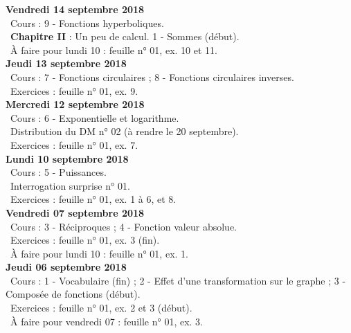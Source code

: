 \documentclass[12pt,a4paper]{article}
\begin{document}
\noindent\textbf{Vendredi 14 septembre 2018}\\
\bu\ Cours : 9 - Fonctions hyperboliques.\\
\bu\ \textbf{Chapitre II} \rm : Un peu de calcul. 1 - Sommes (début).\\
\bu\ À faire pour lundi 10 : feuille n° 01, ex. 10 et 11.\vspace{.4cm}\\

\noindent\textbf{\bf Jeudi 13 septembre 2018}\\
\bu\ Cours : 7 - Fonctions circulaires ; 8 - Fonctions circulaires inverses.\\
\bu\ Exercices : feuille n° 01, ex. 9.\vspace{.4cm}\\
    
\noindent\textbf{\bf Mercredi 12 septembre 2018}\\
\bu\ Cours : 6 - Exponentielle et logarithme.\\
\bu\ Distribution du DM n° 02 (à rendre le 20 septembre).\\
\bu\ Exercices : feuille n° 01, ex. 7.\vspace{.4cm}\\

\noindent\textbf{\bf Lundi 10 septembre 2018}\\
\bu\ Cours : 5 - Puissances.\\
\bu\ Interrogation surprise n° 01.\\
\bu\ Exercices : feuille n° 01, ex. 1 à 6, et 8.\vspace{.4cm}\\

\noindent\textbf{Vendredi 07 septembre 2018}\\
\bu\ Cours : 3 - Réciproques ; 4 - Fonction valeur absolue.\\
\bu\ Exercices : feuille n° 01, ex. 3 (fin).\\
\bu\ À faire pour lundi 10 : feuille n° 01, ex. 1.\vspace{.4cm}\\

\noindent\textbf{\bf Jeudi 06 septembre 2018}\\
\bu\ Cours : 1 - Vocabulaire (fin) ; 2 - Effet d'une transformation sur le graphe ; 3 - Composée de fonctions (début).\\
\bu\ Exercices : feuille n° 01, ex. 2 et 3 (début).\\
\bu\ À faire pour vendredi 07 : feuille n° 01, ex. 3.\vspace{.4cm}\\
    
\end{document}
